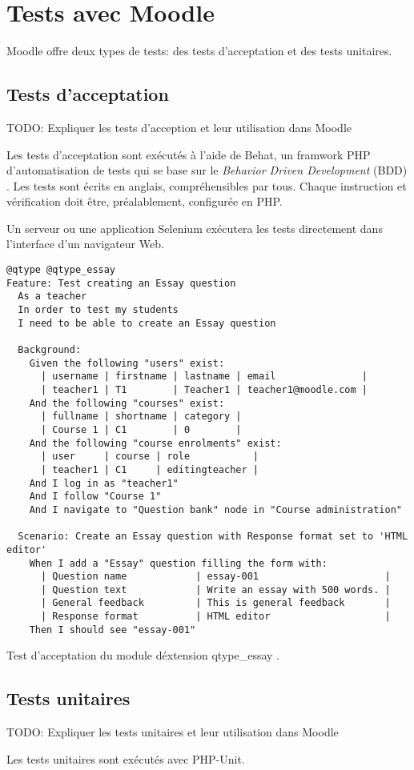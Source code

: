 \chapter{Tests avec Moodle}

Moodle offre deux types de tests: des tests d'acceptation et des tests unitaires.

\section{Tests d'acceptation}

TODO: Expliquer les tests d'acception et leur utilisation dans Moodle

Les tests d'acceptation sont exécutés à l'aide de Behat, un \og framwork \fg{} PHP d'automatisation de tests qui se base sur le \og \textit{Behavior Driven Development} (BDD) \fg{}.
Les tests sont écrits en anglais, compréhensibles par tous.
Chaque instruction et vérification doit être, préalablement, configurée en PHP.

Un serveur ou une application Selenium exécutera les tests directement dans l'interface d'un navigateur Web.

\begin{lstfloat}
\begin{lstlisting}[frame=l]
@qtype @qtype_essay
Feature: Test creating an Essay question
  As a teacher
  In order to test my students
  I need to be able to create an Essay question

  Background:
    Given the following "users" exist:
      | username | firstname | lastname | email               |
      | teacher1 | T1        | Teacher1 | teacher1@moodle.com |
    And the following "courses" exist:
      | fullname | shortname | category |
      | Course 1 | C1        | 0        |
    And the following "course enrolments" exist:
      | user     | course | role           |
      | teacher1 | C1     | editingteacher |
    And I log in as "teacher1"
    And I follow "Course 1"
    And I navigate to "Question bank" node in "Course administration"

  Scenario: Create an Essay question with Response format set to 'HTML editor'
    When I add a "Essay" question filling the form with:
      | Question name            | essay-001                      |
      | Question text            | Write an essay with 500 words. |
      | General feedback         | This is general feedback       |
      | Response format          | HTML editor                    |
    Then I should see "essay-001"
\end{lstlisting}
\caption{Test d'acceptation du module d\'extension \og qtype\_essay \fg{}.}
\label{code:commentaire}
\end{lstfloat}

\section{Tests unitaires}

TODO: Expliquer les tests unitaires et leur utilisation dans Moodle

Les tests unitaires sont exécutés avec PHP-Unit.